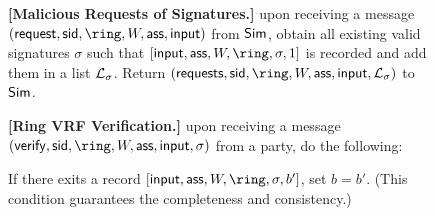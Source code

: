 \begin{figure}
\begin{tcolorbox}[left=2pt,right=2pt]
{			%
			
			\textbf{[Malicious Requests of  Signatures.]} upon receiving a message $ (\oramsg{request}, \sid, \ring, W, \aux,\msg) $ from $ \mathsf{Sim} $, obtain all existing valid signatures $ \sigma $ such that $ [\msg, \aux,W,\ring,\sigma, 1] $ is recorded and add them in a list $ {\mathcal{L}}_{\sigma} $. 	Return $ (\oramsg{requests}, \sid, \ring, W,\aux,\msg, \lst_{\sigma})  $ to $ \mathsf{Sim} $.
			
			
			\textbf{[Ring VRF Verification.]} upon receiving a message $(\oramsg{verify}, \sid, \ring,W, \aux, \msg, \sigma)$ from a party, do the following: 
			\begin{list}{\hspace*{1pt} C}{\setlength\leftmargin{0.15in}}
				\item If there exits a record $ [\msg,\aux,W,\ring,\sigma, b'] $, set $ b = b' $. (This condition guarantees the completeness and consistency.)
				

\end{list}}
\end{tcolorbox}
\end{figure}
